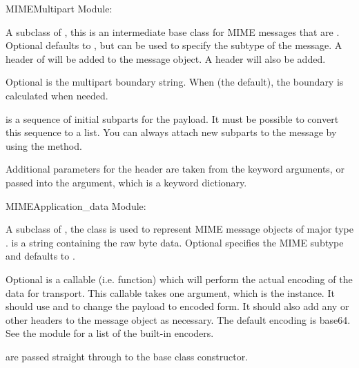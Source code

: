 \begin{classdesc}{MIMEMultipart}{}
Module: 

A subclass of , this is an intermediate base class for
MIME messages that are .  Optional 
defaults to , but can be used to specify the subtype
of the message.  A  header of
 will be added to the message
object.  A  header will also be added.

Optional  is the multipart boundary string.  When
 (the default), the boundary is calculated when needed.

 is a sequence of initial subparts for the payload.  It
must be possible to convert this sequence to a list.  You can always
attach new subparts to the message by using the
 method.

Additional parameters for the  header are
taken from the keyword arguments, or passed into the 
argument, which is a keyword dictionary.

\end{classdesc}

\begin{classdesc}{MIMEApplication}{_data}
Module: 

A subclass of , the  class is
used to represent MIME message objects of major type .
 is a string containing the raw byte data.  Optional 
specifies the MIME subtype and defaults to .  

Optional  is a callable (i.e. function) which will
perform the actual encoding of the data for transport.  This
callable takes one argument, which is the  instance.
It should use  and  to
change the payload to encoded form.  It should also add any
 or other headers to the message
object as necessary.  The default encoding is base64.  See the
 module for a list of the built-in encoders.

 are passed straight through to the base class constructor.
\end{classdesc}

